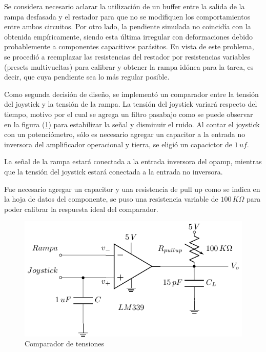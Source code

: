Se considera necesario aclarar la utilización de un buffer entre la salida de la rampa desfasada y el restador para que no se modifiquen los comportamientos entre ambos circuitos. Por otro lado, la pendiente simulada no coincidía con la obtenida empíricamente, siendo esta última irregular con deformaciones debido probablemente a componentes capacitivos parásitos. En vista de este problema, se procedió a reemplazar las resistencias del restador por resistencias variables (presets multivueltas) para calibrar y obtener la rampa idónea para la tarea, es decir, que cuya pendiente sea lo más regular posible.


Como segunda decisión de diseño, se implementó un comparador entre la tensión del joystick y la tensión de la rampa. La tensión del joystick variará respecto del tiempo, motivo por el cual se agrega un filtro pasabajo como se puede observar en la figura (\ref{fig:Comparador}) para estabilizar la señal y disminuir el ruido. Al contar el joystick con un potenciómetro, sólo es necesario agregar un capacitor  a la entrada no inversora del amplificador operacional y tierra, se eligió un capacictor de $1\,uf$.\par
La señal de la rampa estará conectada a la entrada inversora del opamp, mientras que la tensión del joystick estará conectada a la entrada no inversora. \par 
Fue necesario agregar un capacitor y una resistencia de pull up como se indica en la hoja de datos del componente, se puso una resistencia variable de $100\,K\Omega$ para poder calibrar la respuesta ideal del comparador.

\begin{figure}[H]
\centering
\includegraphics[scale=0.8]{Ejercicio8/Circuitos/Comparador.pdf}
\caption{Comparador de tensiones}
\label{fig:Comparador}
\end{figure}

